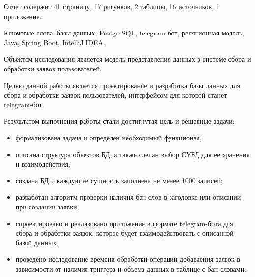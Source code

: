 
Отчет содержит 41 страницу, 17 рисунков, 2 таблицы, 16 источников, 1 приложение.

Ключевые слова: базы данных, PostgreSQL, telegram-бот, реляционная модель, Java, Spring Boot, IntelliJ IDEA.

Объектом исследования является модель представления данных в системе сбора и обработки заявок пользователей.

Целью данной работы является проектирование и разработка базы данных для сбора и обработки заявок пользователей, интерфейсом для которой станет telegram-бот.

Результатом выполнения работы стали достигнутая цель и решенные задачи:
\begin{itemize}
	\item формализована задача и определен необходимый функционал;
	\item описана структура объектов БД, а также сделан выбор СУБД для ее хранения и взаимодействия;
	\item создана БД и каждую ее сущность заполнена не менее 1000 записей;
	\item разработан алгоритм проверки наличия бан-слов в заголовке или описании при создании заявки;
	\item спроектировано и реализовано приложение в формате telegram-бота для сбора и обработки заявок, которое будет взаимодействовать с описанной базой данных;
	\item проведено исследование времени обработки операции добавления заявок в зависимости от наличия триггера и объема данных в таблице с бан-словами.
\end{itemize}